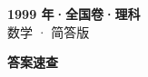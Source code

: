 \documentclass[zihao=-4, a4paper]{ctexart}
\begin{document}
\begin{center}
  {\Large\bfseries 1999 年·全国卷·理科}\\[4pt]
  {\large 数学 · 简答版}
\end{center}
\medskip
{}

\clearpage
{}
\begin{center}{\Large\bfseries 答案速查}\end{center}
\medskip

\end{document}
